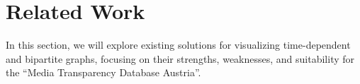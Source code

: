 \documentclass{vgtc}                          %
\begin{document}
\section{Related Work} %

In this section, we will explore existing solutions for visualizing time-dependent and bipartite graphs, focusing on their strengths, weaknesses, and suitability for the ``Media Transparency Database Austria''.











\end{document}

